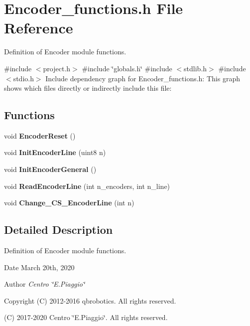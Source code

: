 \section{Encoder\+\_\+functions.\+h File Reference}
\label{_encoder__functions_8h}


Definition of Encoder module functions.  


{\ttfamily \#include $<$project.\+h$>$}\newline
{\ttfamily \#include \char`\"{}globals.\+h\char`\"{}}\newline
{\ttfamily \#include $<$stdlib.\+h$>$}\newline
{\ttfamily \#include $<$stdio.\+h$>$}\newline
Include dependency graph for Encoder\+\_\+functions.\+h\+:
This graph shows which files directly or indirectly include this file\+:
\subsection*{Functions}
\begin{DoxyCompactItemize}
\item 
\mbox{\label{_encoder__functions_8h_a1f711fe1ef258ba1b0d90cbce8a0e645}} 
void {\bfseries Encoder\+Reset} ()
\item 
\mbox{\label{_encoder__functions_8h_aa7dd2ab5bc6e906d2b1baa3dcf030197}} 
void {\bfseries Init\+Encoder\+Line} (uint8 n)
\item 
\mbox{\label{_encoder__functions_8h_a2ee4a1ed078be27aa04157f035933a2f}} 
void {\bfseries Init\+Encoder\+General} ()
\item 
\mbox{\label{_encoder__functions_8h_af23a5b3c809698c750feda90e24f85fe}} 
void {\bfseries Read\+Encoder\+Line} (int n\+\_\+encoders, int n\+\_\+line)
\item 
\mbox{\label{_encoder__functions_8h_a22b528bf1b9a7a0a86b618d7195b106b}} 
void {\bfseries Change\+\_\+\+C\+S\+\_\+\+Encoder\+Line} (int n)
\end{DoxyCompactItemize}


\subsection{Detailed Description}
Definition of Encoder module functions. 

\begin{DoxyDate}{Date}
March 20th, 2020 
\end{DoxyDate}
\begin{DoxyAuthor}{Author}
{\itshape Centro \char`\"{}\+E.\+Piaggio\char`\"{}} 
\end{DoxyAuthor}
\begin{DoxyCopyright}{Copyright}
(C) 2012-\/2016 qbrobotics. All rights reserved. 

(C) 2017-\/2020 Centro \char`\"{}\+E.\+Piaggio\char`\"{}. All rights reserved. 
\end{DoxyCopyright}
